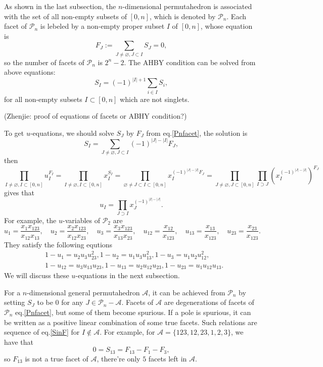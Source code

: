 \documentclass[hidelinks,12pt]{article}
\begin{document}
As shown in the last subsection, the $n$-dimensional permutahedron is associated 
with the set of all non-empty subsets of $[0,n]$, which is denoted by $\mathscr P_n$. 
Each facet of $\mathscr P_n$ is lebeled by a non-empty proper subset $I$ of $[0,n]$, 
whose equation is 
\begin{equation}\label{Pnfacet}
	F_J:=\sum_{J\neq \varnothing, J\subset I} S_J=0,
\end{equation}
so the number of facets of $\mathscr P_n$ is $2^n-2$. The AHBY condition 
can be solved from above equations:
\[
	S_I = (-1)^{|I|+1}\sum_{i\in I} S_i,
\]
for all non-empty subsets $I \subset [0,n]$ which are not singlets.

(Zhenjie: proof of equations of facets or ABHY condition?)

To get $u$-equations, we should solve $S_J$ by $F_J$ from eq.\eqref{Pnfacet}, the 
solution is 
\begin{equation}\label{SinF}
	S_I=\sum_{J\neq \varnothing,J\subset I} (-1)^{|J|-|I|}F_J,
\end{equation}
then
\[
	\prod_{I\neq \varnothing,I\subset [0,n]}u_I^{F_I}=
	\prod_{I\neq \varnothing,I\subset [0,n]}x_I^{S_I}=
	\prod_{\varnothing\neq J\subset I\subset [0,n]}
	x_I^{(-1)^{|J|-|I|}F_J}=
	\prod_{J\neq \varnothing,J\subset [0,n]}
	\prod_{I\supset J}(x_I^{(-1)^{|J|-|I|}})^{F_J}
\]
gives that
\[
	u_I=\prod_{J\supset I}x_J^{(-1)^{|I|-|J|}}.
\]
For example, the $u$-variables of $\mathscr P_2$ are
\[
	u_{1}  = \frac{x_1 x_{123}}{x_{12}x_{13}},\quad 
	u_{2}  = \frac{x_2 x_{123}}{x_{12}x_{23}},\quad
	u_{3}  = \frac{x_3 x_{123}}{x_{13}x_{23}},\quad
	u_{12} = \frac{x_{12}}{x_{123}},\quad 
	u_{13} = \frac{x_{13}}{x_{123}},\quad
	u_{23} = \frac{x_{23}}{x_{123}}.
\]
They satisfy the following equtions
\begin{align*}
	&1-u_{1}=u_{2} u_{3} u_{23}^2,
	1-u_{2}=u_{1} u_{3} u_{13}^2,
	1-u_{3}=u_{1} u_{2} u_{12}^2,\\
	&1-u_{12}=u_{3} u_{13} u_{23},
	1-u_{13}=u_{2} u_{12} u_{23},
	1-u_{23}=u_{1} u_{12} u_{13}.
\end{align*}
We will discuss these $u$-equations in the next subsection.

For a $n$-dimensional general permutahedron $\mathscr A$, it can be achieved 
from $\mathscr P_n$ by setting $S_J$ to be $0$ for any 
$J\in \mathscr P_n-\mathscr A$. Facets of $\mathscr A$ are degenerations of facets 
of $\mathscr P_n$ eq.\eqref{Pnfacet}, but some of them become spurious. If a pole
is spurious, it can be written as a positive linear combination of some true facets.
Such relations are sequence of eq.\eqref{SinF} for $I\not\in \mathscr A$.
For example, for $\mathscr A=\{123,12,23,1,2,3\}$, we have that
\[
	0=S_{13}=F_{13}-F_{1}-F_{3},
\]
so $F_{13}$ is not a true facet of $\mathscr A$, there're only $5$ facets left in
$\mathscr A$.
\end{document}
